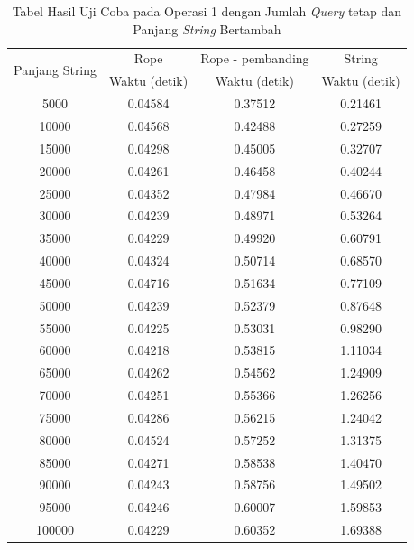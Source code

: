 \begin{appendices}
  \begin{table} [H]
  \centering
	  \begin{tabular}{|c|c|c|c|}
		  \hline
		  \multirow{2}{*}{Panjang String} & Rope & Rope - pembanding & String\\
		  		  & Waktu (detik) & Waktu (detik) & Waktu (detik)\\ \hline
		  5000 & 0.04584	& 0.37512	& 0.21461\\ \hline
		  10000 & 0.04568	& 0.42488	& 0.27259\\ \hline
		  15000 & 0.04298	& 0.45005	& 0.32707\\ \hline
		  20000 & 0.04261	& 0.46458	& 0.40244\\ \hline
		  25000 & 0.04352	& 0.47984	& 0.46670\\ \hline
		  30000 & 0.04239	& 0.48971	& 0.53264\\ \hline
		  35000 & 0.04229	& 0.49920	& 0.60791\\ \hline
		  40000 & 0.04324	& 0.50714	& 0.68570\\ \hline
		  45000 & 0.04716	& 0.51634	& 0.77109\\ \hline
		  50000 & 0.04239	& 0.52379	& 0.87648\\ \hline
		  55000 & 0.04225	& 0.53031	& 0.98290\\ \hline
		  60000 & 0.04218	& 0.53815	& 1.11034\\ \hline
		  65000 & 0.04262	& 0.54562	& 1.24909\\ \hline
		  70000 & 0.04251	& 0.55366	& 1.26256\\ \hline
		  75000 & 0.04286	& 0.56215	& 1.24042\\ \hline
		  80000 & 0.04524	& 0.57252	& 1.31375\\ \hline
		  85000 & 0.04271	& 0.58538	& 1.40470\\ \hline
		  90000 & 0.04243	& 0.58756	& 1.49502\\ \hline
		  95000 & 0.04246	& 0.60007	& 1.59853\\ \hline
		  100000 & 0.04229	& 0.60352	& 1.69388\\ \hline
	  \end{tabular}\caption{Tabel Hasil Uji Coba pada Operasi 1 dengan Jumlah \textit{Query} tetap dan Panjang \textit{String} Bertambah}
	  \label{tab:operasi1string}
  \end{table}
  

\end{appendices}
